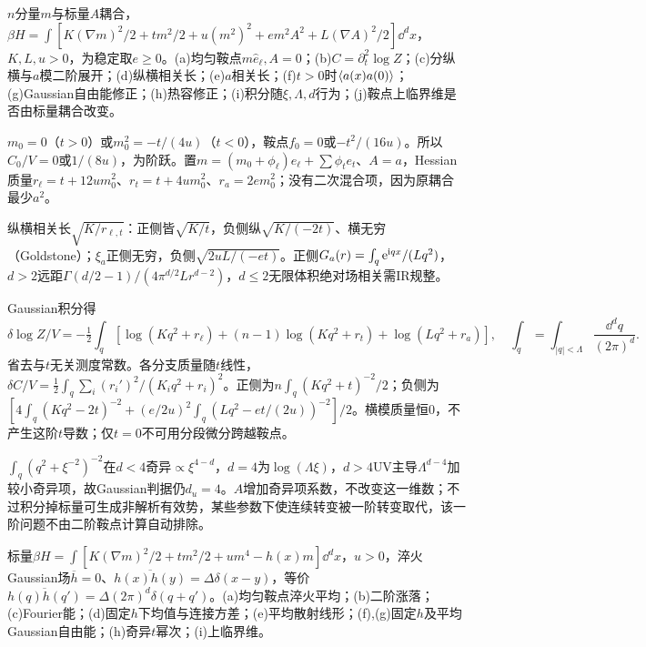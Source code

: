 \begin{exercise}[原题1(a)--(j)]\label{p:334-2-1}
$n$分量$m$与标量$A$耦合，$\beta H=\int[K(\nabla m)^2/2+tm^2/2+u(m^2)^2+em^2A^2+L(\nabla A)^2/2]\dd^dx$，$K,L,u>0$，为稳定取$e\ge0$。(a)均匀鞍点$m\hat e_\ell,A=0$；(b)$C=\partial_t^2\log Z$；(c)分纵横与$a$模二阶展开；(d)纵横相关长；(e)$a$相关长；(f)$t>0$时$\langle a(x)a(0)\rangle$；(g)Gaussian自由能修正；(h)热容修正；(i)积分随$\xi,\Lambda,d$行为；(j)鞍点上临界维是否由标量耦合改变。
\end{exercise}
\begin{solution}
$m_0=0$（$t>0$）或$m_0^2=-t/(4u)$（$t<0$），鞍点$f_0=0$或$-t^2/(16u)$。所以$C_0/V=0$或$1/(8u)$，为阶跃。置$m=(m_0+\phi_\ell)e_\ell+\sum\phi_te_t$、$A=a$，Hessian质量$r_\ell=t+12um_0^2$、$r_t=t+4um_0^2$、$r_a=2em_0^2$；没有二次混合项，因为原耦合最少$a^2$。

纵横相关长$\sqrt{K/r_{\ell,t}}$：正侧皆$\sqrt{K/t}$，负侧纵$\sqrt{K/(-2t)}$、横无穷（Goldstone）；$\xi_a$正侧无穷，负侧$\sqrt{2uL/(-et)}$。正侧$G_a(r)=\int_q\mathrm e^{\mathrm i qx}/(Lq^2)$，$d>2$远距$\Gamma(d/2-1)/(4\pi^{d/2}Lr^{d-2})$，$d\le2$无限体积绝对场相关需IR规整。

Gaussian积分得
\begin{equation}
\delta\log Z/V=-\tfrac12\int_q[\log(Kq^2+r_\ell)+(n-1)\log(Kq^2+r_t)+\log(Lq^2+r_a)],\quad \int_q=\int_{|q|<\Lambda}\frac{\dd^dq}{(2\pi)^d}.
\end{equation}
省去与$t$无关测度常数。各分支质量随$t$线性，$\delta C/V=\tfrac12\int_q\sum_i(r_i')^2/(K_iq^2+r_i)^2$。正侧为$n\int_q(Kq^2+t)^{-2}/2$；负侧为$[4\int_q(Kq^2-2t)^{-2}+(e/2u)^2\int_q(Lq^2-et/(2u))^{-2}]/2$。横模质量恒0，不产生这阶$t$导数；仅$t=0$不可用分段微分跨越鞍点。

$\int_q(q^2+\xi^{-2})^{-2}$在$d<4$奇异$\propto\xi^{4-d}$，$d=4$为$\log(\Lambda\xi)$，$d>4$UV主导$\Lambda^{d-4}$加较小奇异项，故Gaussian判据仍$d_u=4$。$A$增加奇异项系数，不改变这一维数；不过积分掉标量可生成非解析有效势，某些参数下使连续转变被一阶转变取代，该一阶问题不由二阶鞍点计算自动排除。
\end{solution}
\begin{exercise}[原题2(a)--(i)]\label{p:334-2-2}
标量$\beta H=\int[K(\nabla m)^2/2+tm^2/2+um^4-h(x)m]\dd^dx$，$u>0$，淬火Gaussian场$\overline h=0$、$\overline{h(x)h(y)}=\Delta\delta(x-y)$，等价$\overline{h(q)h(q')}=\Delta(2\pi)^d\delta(q+q')$。(a)均匀鞍点淬火平均；(b)二阶涨落；(c)Fourier能；(d)固定$h$下均值与连接方差；(e)平均散射线形；(f),(g)固定$h$及平均Gaussian自由能；(h)奇异$t$幂次；(i)上临界维。
\end{exercise}
